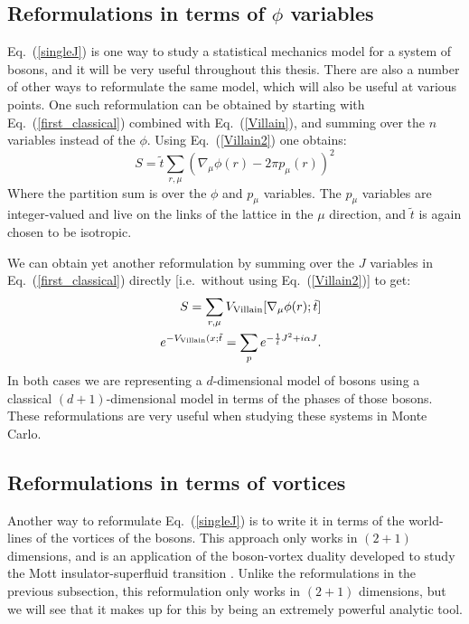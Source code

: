 \subsection{Reformulations in terms of $\phi$ variables}
Eq.~(\ref{singleJ}) is one way to study a statistical mechanics model for a system of bosons, and it will be very useful throughout this thesis. There are also a number of other ways to reformulate the same model, which will also be useful at various points. One such reformulation can be obtained by starting with Eq.~(\ref{first_classical}) combined with Eq.~(\ref{Villain}), and summing over the $n$ variables instead of the $\phi$. Using Eq.~(\ref{Villain2}) one obtains:
\begin{equation}
S=\tilde t \sum_{r,\mu} (\nabla_\mu \phi(r)-2\pi p_\mu(r))^2
\label{singleRods}
\end{equation}
Where the partition sum is over the $\phi$ and $p_\mu$ variables. The $p_\mu$ variables are integer-valued and live on the links of the lattice in the $\mu$ direction, and $\tilde t$ is again chosen to be isotropic. 

We can obtain yet another reformulation by summing over the $J$ variables in Eq.~(\ref{first_classical}) directly [i.e.~without using Eq.~(\ref{Villain2})] to get:
\begin{eqnarray}
&&S=\sum_{r,\mu} V_{\rm Villain} [\nabla_\mu \phi(r);\tilde t]\nonumber\\
&&e^{-V_{\rm Villain}(x;\tilde t}=\sum_{p} e^{-\frac{1}{\tilde t} J^2+i\alpha J}.
\label{singleVillain}
\end{eqnarray}
In both cases we are representing a $d$-dimensional model of bosons using a classical $(d+1)$-dimensional model in terms of the phases of those bosons. These reformulations are very useful when studying these systems in Monte Carlo. 

\subsection{Reformulations in terms of vortices}
\label{subsec::JtoQ}
Another way to reformulate Eq.~(\ref{singleJ}) is to write it in terms of the world-lines of the vortices of the bosons. This approach only works in $(2+1)$ dimensions, and is an application of the boson-vortex duality developed to study the Mott insulator-superfluid transition\cite{PolyakovBook, Peskin1978, Dasgupta1981, FisherLee1989, LeeFisher1989, artphoton,short_range3} . Unlike the reformulations in the previous subsection, this reformulation only works in $(2+1)$ dimensions, but we will see that it makes up for this by being an extremely powerful analytic tool. 

